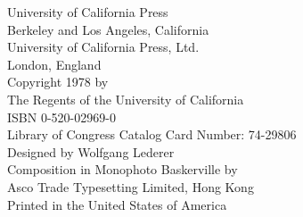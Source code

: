 
\thispagestyle{empty}
\vspace*{\fill}
\begin{flushright}
University of California Press\\
Berkeley and Los Angeles, California\\
University of California Press, Ltd.\\
London, England\\
\vspace{1.5\baselineskip}
Copyright 1978 by\\
The Regents of the University of California\\
\vspace{1.5\baselineskip}
ISBN 0-520-02969-0\\
Library of Congress Catalog Card Number: 74-29806\\
\vspace{1.5\baselineskip}
Designed by Wolfgang Lederer\\
Composition in Monophoto Baskerville by\\
Asco Trade Typesetting Limited, Hong Kong\\
Printed in the United States of America
\end{flushright}
\clearpage
